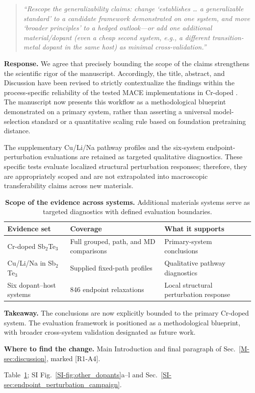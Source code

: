 \documentclass[11pt]{article}
\newcommand{\location}[2]{\par{\small\textbf{Where to find the change.} #1\par #2}\par}
\begin{document}
\begin{quote}\small \itshape
``Rescope the generalizability claims: change `establishes \ldots{} a generalizable standard' to a candidate framework demonstrated on one system, and move `broader principles' to a hedged outlook---or add one additional material/dopant (even a cheap second system, e.g., a different transition-metal dopant in the same host) as minimal cross-validation.''\end{quote}

\textbf{Response.} 
We agree that precisely bounding the scope of the claims strengthens the scientific rigor of the manuscript. 
Accordingly, the title, abstract, and Discussion have been revised to strictly contextualize the findings within the process-specific reliability of the tested MACE implementations in Cr-doped . The manuscript now presents this workflow as a methodological blueprint demonstrated on a primary system, rather than asserting a universal model-selection standard or a quantitative scaling rule based on foundation pretraining distance.

The supplementary Cu/Li/Na pathway profiles and the six-system endpoint-perturbation evaluations are retained as targeted qualitative diagnostics. These specific tests evaluate localized structural perturbation responses; therefore, they are appropriately scoped and are not extrapolated into macroscopic transferability claims across new materials.

\begin{table}[!htbp]
\centering\small
\caption{\textbf{Scope of the evidence across systems.} Additional materials systems serve as targeted diagnostics with defined evaluation boundaries.}
\label{tab:resp-a4-scope}
\begin{tabular}{p{}p{}p{}}
\toprule
Evidence set & Coverage & What it supports \\
\midrule
Cr-doped Sb$_2$Te$_3$ & Full grouped, path, and MD comparisons & Primary-system conclusions \\
Cu/Li/Na in Sb$_2$Te$_3$ & Supplied fixed-path profiles & Qualitative pathway diagnostics \\
Six dopant--host systems & 846 endpoint relaxations & Local structural perturbation response \\
\bottomrule
\end{tabular}
\end{table}

\textbf{Takeaway.} The conclusions are now explicitly bounded to the primary Cr-doped  system. The evaluation framework is positioned as a methodological blueprint, with broader cross-system validation designated as future work.
\location{Main Introduction and final paragraph of Sec.~\ref{M-sec:discussion}, marked [R1-A4].}{Table~\ref{tab:resp-a4-scope}; SI Fig.~\ref{SI-fig:other_dopants}a--l and Sec.~\ref{SI-sec:endpoint_perturbation_campaign}.}
\end{document}
